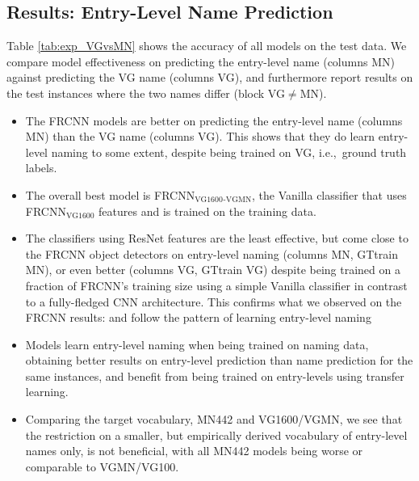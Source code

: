 \subsection{Results: Entry-Level Name Prediction}
\label{sect:exp_results}
Table \ref{tab:exp_VGvsMN} shows the accuracy of all models on the \mn test data. 
We compare model effectiveness on predicting the entry-level name (columns MN) against predicting the \arbitrary VG name (columns VG), and furthermore report results on the test instances where the two names differ (block VG$\neq$MN). 
\begin{itemize}
	\item The FRCNN models are better on predicting the entry-level name (columns MN) than the \arbitrary VG name (columns VG). 
	This shows that they do learn entry-level naming to some extent, despite being trained on VG, i.e.,~\arbitrary ground truth labels.
	\item The overall best model is FRCNN$_\text{VG1600}$$_\text{-VGMN}$, the Vanilla classifier that uses  FRCNN$_\text{VG1600}$ features and is trained on the \mn training data. 
	\item {} The classifiers using ResNet features are the least effective, but come close to the FRCNN object detectors on entry-level naming (columns MN, GTtrain MN), or even better  (columns VG, GTtrain VG) despite being trained on a fraction of FRCNN's training size using a simple Vanilla classifier in contrast to a fully-fledged CNN architecture.
	This confirms what we observed on the FRCNN results: and follow the pattern of learning entry-level naming  
	\item Models learn entry-level naming when being trained on \arbitrary naming data, obtaining better results on entry-level prediction than \arbitrary name prediction for the same instances, and benefit from being trained on entry-levels using transfer learning. 
	\item Comparing the target vocabulary, MN442 and VG1600/VGMN, we see that the restriction on a smaller, but empirically derived vocabulary of entry-level names only, is not beneficial, with all MN442 models being worse or comparable to VGMN/VG100.
\end{itemize}

